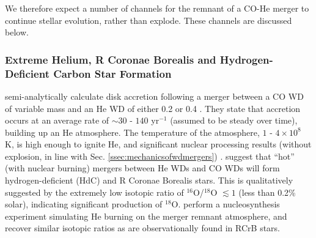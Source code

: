 We therefore expect a number of channels for the remnant of a CO-He merger to continue stellar evolution, rather than explode.  These channels are discussed below.


\subsubsection{Extreme Helium, R Coronae Borealis and Hydrogen-Deficient Carbon Star Formation}

\cite{clay+07} semi-analytically calculate disk accretion following a merger between a CO WD of variable mass and an He WD of either 0.2 or 0.4 {\Msun}.  They state that accretion occurs at an average rate of $\sim 30$ - $140$ {\Msun} yr$^{-1}$ (assumed to be steady over time), building up an He atmosphere.   The temperature of the atmosphere, $1$ - $4 \times 10^8$ K, is high enough to ignite He, and significant nuclear processing results (without explosion, in line with Sec. \ref{ssec:mechanicsofwdmergers}) \citep{clay+07}.  \citeauthor{clay+07} suggest that ``hot'' (with nuclear burning) mergers between He WDs and CO WDs will form hydrogen-deficient (HdC) and R Coronae Borealis stars.  This is qualitatively suggested by the extremely low isotopic ratio of $^{16}$O/$^{18}$O $\lesssim 1$ (less than 0.2\% solar), indicating significant production of $^{18}$O.  \citeauthor{clay+07} perform a nucleosynthesis experiment simulating He burning on the merger remnant atmosphere, and recover similar isotopic ratios as are observationally found in RCrB stars.


